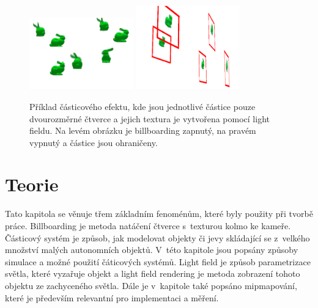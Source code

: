 \begin{figure}[H]
	\centering
	\includegraphics[width=0.4\textwidth]{obrazky-figures/particles_fake.png}
	\includegraphics[width=0.4\textwidth]{obrazky-figures/particles_true.png}
	\caption{Příklad částicového efektu, kde jsou jednotlivé částice pouze dvourozměrné čtverce a jejich textura je vytvořena pomocí light fieldu. Na levém obrázku je billboarding zapnutý, na pravém vypnutý a částice jsou ohraničeny.}
	\label{fig:uvod_example}
\end{figure}
\chapter{Teorie}
Tato kapitola se věnuje třem základním fenoménům, které byly použity při tvorbě práce. Billboarding je metoda natáčení čtverce s~texturou kolmo ke kameře. Částicový systém je způsob, jak modelovat objekty či jevy skládající se z~velkého množství malých autonomních objektů. V~této kapitole jsou popsány způsoby simulace a možné použití čáticových systémů. Light field je způsob parametrizace světla, které vyzařuje objekt a light field rendering je metoda zobrazení tohoto objektu ze zachyceného světla. Dále je v~kapitole také popsáno mipmapování, které je především relevantní pro implementaci a měření.
